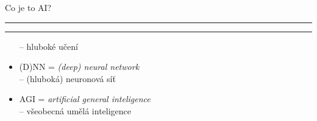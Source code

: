 \documentclass[aspectratio=43]{beamer}
\def\vs{\vspace{-2mm}}
\def\lend{\phantom{g}\vspace{1.5mm}\hrule\hrule}
\begin{document}
\begin{frame}{\vs Co je to AI? \lend}
\begin{itemize}
        -- hluboké učení\\ \vspace{4.0mm}
    \item<3-> (D)NN = \textit{(deep) neural network}\\ \vspace{1mm}
        -- (hluboká) neuronová síť\\ \vspace{4.0mm}
    \item<4-> AGI = \textit{artificial general inteligence}\\ \vspace{1mm}
        -- všeobecná umělá inteligence
\end{itemize}
\end{frame}
\end{document}
